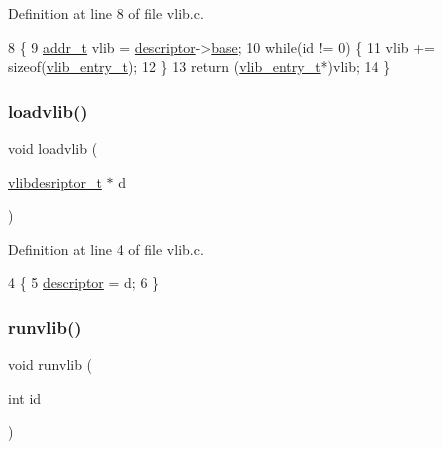 Definition at line 8 of file vlib.\+c.


\begin{DoxyCode}
8                                    \{
9     \hyperlink{a00125_a295f71165288684c38c6bb836fbb3c59_a295f71165288684c38c6bb836fbb3c59}{addr\_t} vlib = \hyperlink{a00170_abe9fbaaf473cf2fa8d2a0ef1786fabd2_abe9fbaaf473cf2fa8d2a0ef1786fabd2}{descriptor}->\hyperlink{a00270_a0a6151ac18d60c648baec065efc9af1a_a0a6151ac18d60c648baec065efc9af1a}{base};
10     \textcolor{keywordflow}{while}(\textcolor{keywordtype}{id} != 0) \{
11         vlib += \textcolor{keyword}{sizeof}(\hyperlink{a00170_a97c1a7136f2ab06368e93c2d7533d619_a97c1a7136f2ab06368e93c2d7533d619}{vlib\_entry\_t});
12     \}
13     \textcolor{keywordflow}{return} (\hyperlink{a00266}{vlib\_entry\_t}*)vlib;
14 \}
\end{DoxyCode}
\mbox{\label{a00167_aee69008de31826f28854c29a54cb315e_aee69008de31826f28854c29a54cb315e}} 
\subsubsection{\texorpdfstring{loadvlib()}{loadvlib()}}
{\footnotesize\ttfamily void loadvlib (\begin{DoxyParamCaption}\item[{\hyperlink{a00170_a2d9000b4fbb25c5ed2950a2d8f4921d5_a2d9000b4fbb25c5ed2950a2d8f4921d5}{vlibdesriptor\+\_\+t} $\ast$}]{d }\end{DoxyParamCaption})}



Definition at line 4 of file vlib.\+c.


\begin{DoxyCode}
4                                   \{
5     \hyperlink{a00170_abe9fbaaf473cf2fa8d2a0ef1786fabd2_abe9fbaaf473cf2fa8d2a0ef1786fabd2}{descriptor} = d;
6 \}
\end{DoxyCode}
\mbox{\label{a00167_a6889af26c1cca94090023d5975955cbf_a6889af26c1cca94090023d5975955cbf}} 
\subsubsection{\texorpdfstring{runvlib()}{runvlib()}}
{\footnotesize\ttfamily void runvlib (\begin{DoxyParamCaption}\item[{int}]{id }\end{DoxyParamCaption})}



